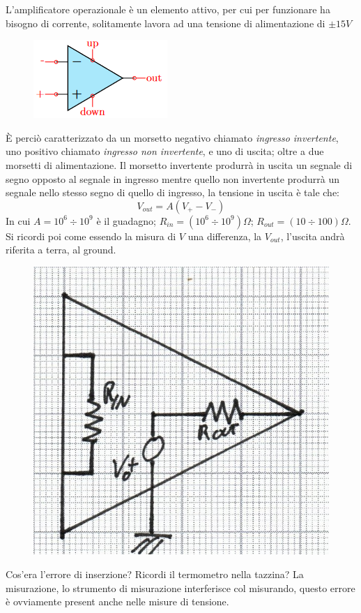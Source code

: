 \documentclass[a4paper, 15pt]{article}
\begin{document}
\begin{adjustwidth}{2in}{}
		L'amplificatore operazionale è un elemento attivo, per cui per funzionare ha bisogno di corrente, solitamente lavora ad una tensione di alimentazione di $\pm15 V$	
\begin{figure}[H]
	\centering
	\includegraphics[width=0.3\linewidth]{immagini/screenshot001}
	\label{fig:screenshot001}
\end{figure}
		È perciò caratterizzato da un morsetto negativo chiamato \textit{ingresso invertente}, uno positivo chiamato \textit{ingresso non invertente}, e uno di uscita; oltre a due morsetti di alimentazione. Il morsetto invertente produrrà in uscita un segnale di segno opposto al segnale in ingresso mentre quello non invertente produrrà un segnale nello stesso segno di quello di ingresso, la tensione in uscita è tale che:
		\[V_{out} = A(V_+-V_-)\]
		In cui $A = 10^6 \div 10^9$ è il guadagno; $R_{in} = (10^6\div10^9) \Omega$; $R_{out} =(10\div100) \Omega $. Si ricordi poi come essendo la misura di $V$ una differenza, la $V_{out}$, l'uscita andrà riferita a terra, al ground.  		
\begin{figure}[H]
	\centering
	\includegraphics[width=0.2\linewidth]{immagini/mm(1)}
	\label{fig:mm1}
\end{figure}
		Cos'era l'errore di inserzione? Ricordi il termometro nella tazzina? La misurazione, lo strumento di misurazione interferisce col misurando, questo errore è ovviamente present anche nelle misure di tensione. 
		

\end{adjustwidth}
\end{document}
